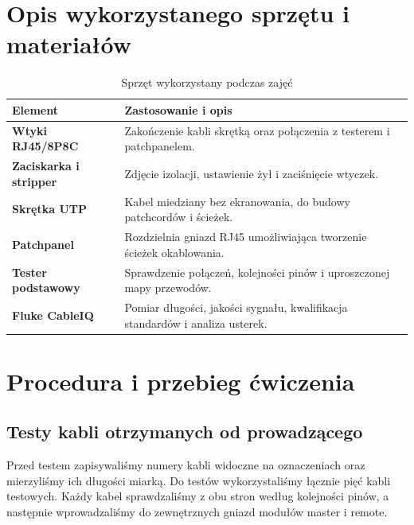 \documentclass[12pt,a4paper]{article}
\begin{document}
\section{Opis wykorzystanego sprzętu i materiałów}
\begin{table}[H]
\centering
\begin{tabularx}{\textwidth}{>{\bfseries}p{} X}
\toprule
Element & Zastosowanie i opis \\
\midrule
Wtyki RJ45/8P8C & Zakończenie kabli skrętką oraz połączenia z testerem i patchpanelem. \\
Zaciskarka i stripper & Zdjęcie izolacji, ustawienie żył i zaciśnięcie wtyczek. \\
Skrętka UTP & Kabel miedziany bez ekranowania, do budowy patchcordów i ścieżek. \\
Patchpanel & Rozdzielnia gniazd RJ45 umożliwiająca tworzenie ścieżek okablowania. \\
Tester podstawowy & Sprawdzenie połączeń, kolejności pinów i uproszczonej mapy przewodów. \\
Fluke CableIQ & Pomiar długości, jakości sygnału, kwalifikacja standardów i analiza usterek. \\
\bottomrule
\end{tabularx}
\caption{Sprzęt wykorzystany podczas zajęć}
\end{table}

\section{Procedura i przebieg ćwiczenia}
\subsection{Testy kabli otrzymanych od prowadzącego}
Przed testem zapisywaliśmy numery kabli widoczne na oznaczeniach oraz mierzyliśmy ich długości miarką. Do testów wykorzystaliśmy łącznie pięć kabli testowych. Każdy kabel sprawdzaliśmy z obu stron według kolejności pinów, a następnie wprowadzaliśmy do zewnętrznych gniazd modułów master i remote.
\end{document}
